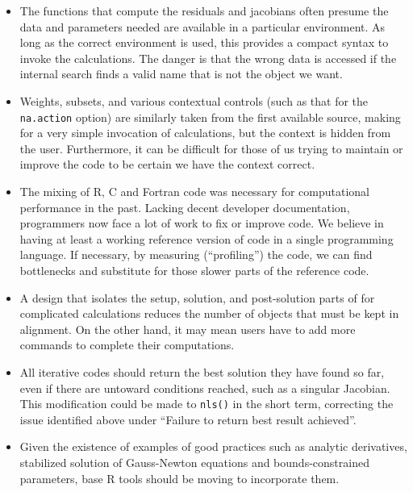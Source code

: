 \documentclass[
]{article}
\begin{document}
\begin{itemize}
\item
  The functions that compute the residuals and jacobians often presume
  the data and parameters needed are available in a particular
  environment. As long as the correct environment is used, this provides
  a compact syntax to invoke the calculations. The danger is that the
  wrong data is accessed if the internal search finds a valid name that
  is not the object we want.
\item
  Weights, subsets, and various contextual controls (such as that for
  the \texttt{na.action} option) are similarly taken from the first
  available source, making for a very simple invocation of calculations,
  but the context is hidden from the user. Furthermore, it can be
  difficult for those of us trying to maintain or improve the code to be
  certain we have the context correct.
\item
  The mixing of R, C and Fortran code was necessary for computational
  performance in the past. Lacking decent developer documentation,
  programmers now face a lot of work to fix or improve code. We believe
  in having at least a working reference version of code in a single
  programming language. If necessary, by measuring (``profiling'') the
  code, we can find bottlenecks and substitute for those slower parts of
  the reference code.
\item
  A design that isolates the setup, solution, and post-solution parts of
  for complicated calculations reduces the number of objects that must
  be kept in alignment. On the other hand, it may mean users have to add
  more commands to complete their computations.
\item
  All iterative codes should return the best solution they have found so
  far, even if there are untoward conditions reached, such as a singular
  Jacobian. This modification could be made to \texttt{nls()} in the
  short term, correcting the issue identified above under ``Failure to
  return best result achieved''.
\item
  Given the existence of examples of good practices such as analytic
  derivatives, stabilized solution of Gauss-Newton equations and
  bounds-constrained parameters, base R tools should be moving to
  incorporate them.
\end{itemize}
\end{document}
